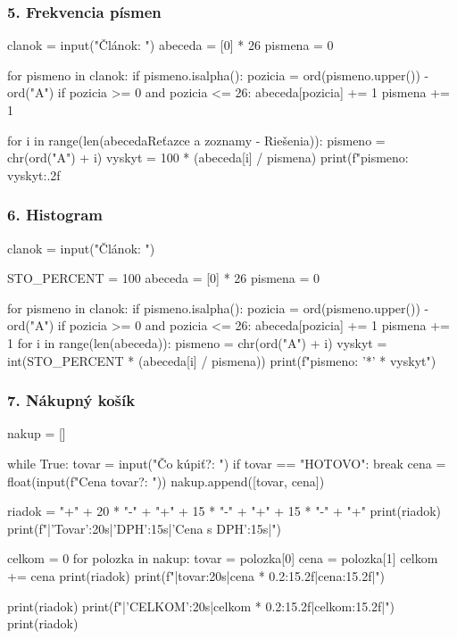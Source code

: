 \subsubsection*{5. Frekvencia písmen}
\begin{solution}
clanok = input("Článok: ")
abeceda = [0] * 26
pismena = 0

for pismeno in clanok:
    if pismeno.isalpha():
        pozicia = ord(pismeno.upper()) - ord("A")
        if pozicia >= 0 and pozicia <= 26:
            abeceda[pozicia] += 1
            pismena += 1

for i in range(len(abecedaReťazce a zoznamy - Riešenia)):
    pismeno = chr(ord("A") + i)
    vyskyt = 100 * (abeceda[i] / pismena)
    print(f"{pismeno}: {vyskyt:.2f}%
\end{solution}

\subsubsection*{6. Histogram}
\begin{solution}
clanok = input("Článok: ")

STO_PERCENT = 100
abeceda = [0] * 26
pismena = 0

for pismeno in clanok:
    if pismeno.isalpha():
        pozicia = ord(pismeno.upper()) - ord("A")
        if pozicia >= 0 and pozicia <= 26:
            abeceda[pozicia] += 1
            pismena += 1
for i in range(len(abeceda)):
	pismeno = chr(ord("A") + i)
	vyskyt = int(STO_PERCENT * (abeceda[i] / pismena))
	print(f"{pismeno}: {'*' * vyskyt}")
\end{solution}

\subsubsection*{7. Nákupný košík}
\begin{solution}
nakup = []

while True:
    tovar = input("Čo kúpiť?: ")
    if tovar == "HOTOVO":
        break
    cena = float(input(f"Cena {tovar}?: "))
    nakup.append([tovar, cena])

riadok = "+" + 20 * "-" + "+" + 15 * "-" + "+" + 15 * "-" + "+"
print(riadok)
print(f"|{'Tovar':20s}|{'DPH':15s}|{'Cena s DPH':15s}|")

celkom = 0
for polozka in nakup:
    tovar = polozka[0]
    cena = polozka[1]
    celkom += cena
    print(riadok)
    print(f"|{tovar:20s}|{cena * 0.2:15.2f}|{cena:15.2f}|")

print(riadok)
print(f"|{'CELKOM':20s}|{celkom * 0.2:15.2f}|{celkom:15.2f}|")
print(riadok)
\end{solution}


